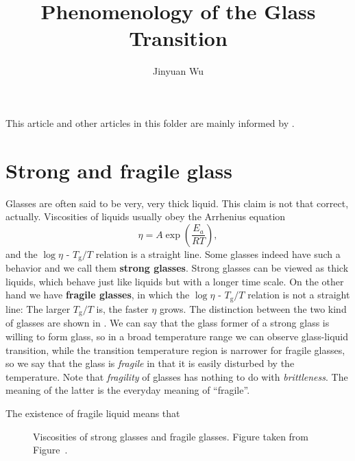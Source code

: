 \documentclass[hyperref, a4paper]{article}
\title{Phenomenology of the Glass Transition}
\author{Jinyuan Wu}
\newcommand*{\concept}[1]{{\textbf{#1}}}
\begin{document}
\maketitle

This article and other articles in this folder are mainly informed by \cite{uni-chem-review}.

\section{Strong and fragile glass}

Glasses are often said to be very, very thick liquid. This claim is not that correct, actually.
Viscosities of liquids usually obey the Arrhenius equation \cite{viscosity-liquid}
\begin{equation}
    \eta = A \exp \left(\dfrac{E_a}{RT} \right) ,
    \label{eq:arrhenius}
\end{equation}
and the $\log \eta$ - $T_\text{g} / T$ relation is a straight line. 
Some glasses indeed have such a behavior and we call them \concept{strong glasses}. 
Strong glasses can be viewed as thick liquids, which behave just like liquids but with a longer time scale.
On the other hand we have \concept{fragile glasses}, in which the $\log \eta$ - $T_\text{g} / T$ relation 
is not a straight line: The larger $T_\text{g} / T$ is, the faster $\eta$ grows. 
The distinction between the two kind of glasses are shown in .
We can say that the glass former of a strong glass is willing to form glass, so in a broad temperature range we 
can observe glass-liquid transition, while the transition temperature region is narrower for fragile glasses,
so we say that the glass is \emph{fragile} in that it is easily disturbed by the temperature. 
Note that \emph{fragility} of glasses has nothing to do with \emph{brittleness}.
The meaning of the latter is the everyday meaning of ``fragile''.

The existence of fragile liquid means that 

\begin{figure}
    \centering
    
    \caption{Viscosities of strong glasses and fragile glasses. Figure taken from Figure~\cite{uni-chem-review}.}
    \label{fig:viscosity}
\end{figure}

\section{}


 
\end{document}
